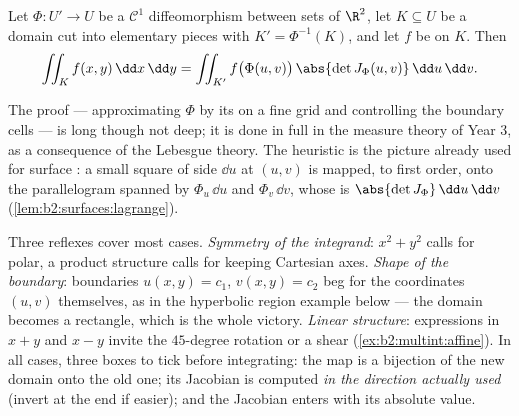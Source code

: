 \begin{theorem}\label{thm:b2:multint:changevar}
Let $\Phi \colon U' \to U$ be a $\mathcal{C}^1$ diffeomorphism
between  sets of $\R^2$, let $K \subseteq U$ be a 
domain cut into elementary pieces with $K' = \Phi^{-1}(K)$, and
let $f$ be  on $K$. Then
\[
\iint_K f(x, y)\,\dd x\,\dd y
= \iint_{K'} f\bigl(\Phi(u, v)\bigr)\,
\abs{\det J_\Phi(u, v)}\,\dd u\,\dd v .
\]
\end{theorem}
\admitted

\begin{remark}
The  proof --- approximating $\Phi$ by its  on
a fine grid and controlling the boundary cells --- is long though
not deep; it is done in full in the measure theory of Year 3, as a
consequence of the Lebesgue theory. The heuristic is the picture
already used for surface : a small square of side $\dd u$ at
$(u, v)$ is mapped, to first order, onto the parallelogram spanned
by $\Phi_u\,\dd u$ and $\Phi_v\,\dd v$, whose  is
$\abs{\det J_\Phi}\,\dd u\,\dd v$
(\cref{lem:b2:surfaces:lagrange}).
\end{remark}

\begin{remark}
Three reflexes cover most cases. \emph{Symmetry of the
integrand}: $x^2 + y^2$ calls for polar, a product structure
calls for keeping Cartesian axes. \emph{Shape of the
boundary}: boundaries $u(x,y) = c_1$, $v(x,y) = c_2$ beg for
the coordinates $(u, v)$ themselves, as in the hyperbolic
region example below --- the domain becomes a rectangle,
which is the whole victory. \emph{Linear structure}:
expressions in $x + y$ and $x - y$ invite the $45$-degree
rotation or a shear (\cref{ex:b2:multint:affine}). In all
cases, three boxes to tick before integrating: the map is a
bijection of the new domain onto the old one; its Jacobian
is computed \emph{in the direction actually used} (invert at
the end if easier); and the Jacobian enters with its
absolute value.
\end{remark}

